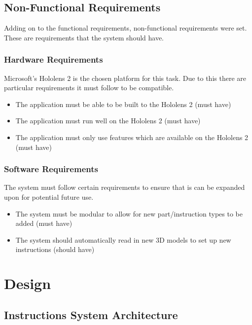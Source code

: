 \documentclass{l4proj}
\begin{document}
\section{Non-Functional Requirements}

Adding on to the functional requirements, non-functional requirements were set. These are requirements that the system should have.

\subsection{Hardware Requirements}

Microsoft's Hololens 2 is the chosen platform for this task. Due to this there are particular requirements it must follow to be compatible. 

\begin{itemize}
    \item The application must be able to be built to the Hololens 2 (must have)
    \item The application must run well on the Hololens 2 (must have)
    \item The application must only use features which are available on the Hololens 2 (must have)
\end{itemize}

\subsection{Software Requirements}

The system must follow certain requirements to ensure that is can be expanded upon for potential future use.

\begin{itemize}
    \item The system must be modular to allow for new part/instruction types to be added (must have)
    \item The system should automatically read in new 3D models to set up new instructions (should have)
\end{itemize}

\chapter{Design}
\label{chap:design}

\section{Instructions System Architecture}
\end{document}
